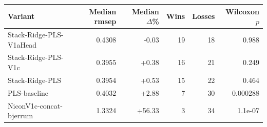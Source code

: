 \begin{tabular}{lrrrrr}
\toprule
Variant & Median rmsep & Median $\Delta$\% & Wins & Losses & Wilcoxon $p$ \\ 
\midrule
Stack-Ridge-PLS-V1aHead & 0.4308 & -0.03 & 19 & 18 & 0.988 \\ 
Stack-Ridge-PLS-V1c & 0.3955 & +0.38 & 16 & 21 & 0.249 \\ 
Stack-Ridge-PLS & 0.3954 & +0.53 & 15 & 22 & 0.464 \\ 
PLS-baseline & 0.4032 & +2.88 & 7 & 30 & 0.000288 \\ 
NiconV1c-concat-bjerrum & 1.3324 & +56.33 & 3 & 34 & 1.1e-07 \\ 
\bottomrule
\end{tabular}
